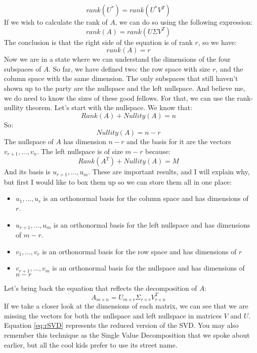 \documentclass[600paper, 11pt,twoside,openany]{kdp}
\begin{document}
\[rank(U^*) = rank(U^*V^T)\]
\indent If we wish to calculate the rank of $A$, we can do so using the following expression:
\[rank(A) = rank\left(U \Sigma V^T \right)\]
\indent The conclusion is that the right side of the equation is of rank $r$, so we have:
\[rank(A) = r\]
\indent Now we are in a state where we can understand the dimensions of the four subspaces of $A$. So far, we have defined two: the row space with size $r$, and the column space with the same dimension. The only subspaces that still haven’t shown up to the party are the nullspace and the left nullspace. And believe me, we do need to know the sizes of these good fellows. For that, we can use the rank-nullity theorem. Let’s start with the nullspace. We know that:
\[Rank(A) + Nullity(A) = n \]
\indent So:
\[Nullity(A) = n - r\]
\indent The nullspace of $A$ has dimension $n−r$ and the basis for it are the vectors $v_{r+1},...,v_{n}$. The left nullspace is of size $m−r$ because:
\[Rank(A^T) + Nullity(A) = M \]
\indent And its basis is $u_{r+1},...,u_m$. These are important results, and I will explain why, but first I would like to box them up so we can store them all in one place:
\newpage
\begin{tcolorbox}
\begin{itemize}
\item $u_1,...,u_r$ is an orthonormal basis for the column space and has dimensions of $r$.
\item $u_{r+1},...,u_m$ is an orthonormal basis for the left nullspace and has dimensions of $m-r$.
\item $v_1,...,v_r$ is an orthonormal basis for the row space and has dimensions of $r$
\item $v_{r+1},...,v_m$ is an orthonormal basis for the  nullspace and has dimensions of $n-r$
\end{itemize}
\end{tcolorbox}
\indent Let’s bring back the equation that reflects the decomposition of $A$:
\begin{equation}\label{eq:rSVD}
A_{m \times n} = U_{m \times r} \Sigma_{r \times r} V^T_{r \times n} 
\end{equation}
\indent If we take a closer look at the dimensions of each matrix, we can see that we are missing the vectors for both the nullspace and left nullspace in matrices $V$ and $U$. Equation \ref{eq:rSVD} represents the reduced version of the SVD. You may also remember this technique as the Single Value Decomposition that we spoke about earlier, but all the cool kids prefer to use its street name.
\newpage
\end{document}
